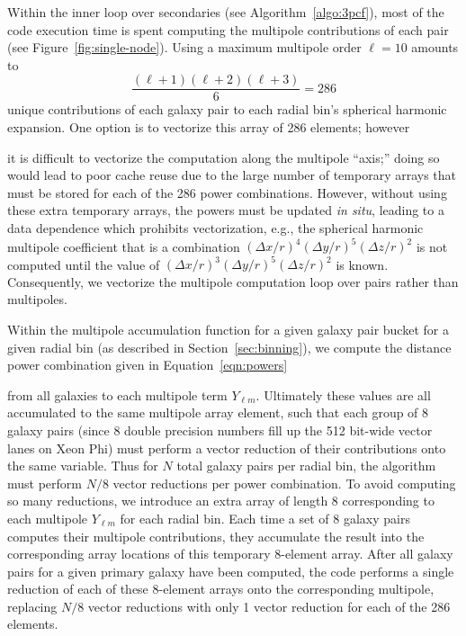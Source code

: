 Within the inner loop over secondaries (see Algorithm~\ref{algo:3pcf}), most of the code execution time is spent computing the multipole contributions of each pair (see  Figure~\ref{fig:single-node}).
Using a maximum multipole order $\ell = 10$ amounts to
\begin{equation*}
\frac{(\ell + 1) (\ell + 2) (\ell + 3)}{6} = 286
\end{equation*}
unique contributions of each galaxy pair to each radial bin's spherical harmonic expansion. 
One option is to vectorize this array of 286 elements; however

it is difficult to vectorize the computation along the multipole ``axis;'' doing so would lead to poor cache reuse due to the large number of temporary arrays that must be stored for each of the 286 power combinations.
However, without using these extra temporary arrays, the powers must be updated \textit{in situ}, leading to a data dependence which prohibits vectorization, e.g., the spherical harmonic multipole coefficient that is a combination $(\Delta x/r)^4(\Delta y/r)^5(\Delta z/r)^2$ is not computed until the value of $(\Delta x/r)^3(\Delta y/r)^5(\Delta z/r)^2$ is known.
Consequently, we vectorize the multipole computation loop over pairs rather than multipoles.

Within the multipole accumulation function for a given galaxy pair bucket for a given radial bin (as described in Section~\ref{sec:binning}), we compute the distance power combination given in Equation~\ref{eqn:powers}

from all galaxies to each multipole term $Y_{\ell m}$.
Ultimately these values are all accumulated to the same multipole array element, such that each group of 8 galaxy pairs (since 8 double precision numbers fill up the 512 bit-wide vector lanes on Xeon Phi) must perform a vector reduction of their contributions onto the same variable.
Thus for $N$ total galaxy pairs per radial bin, the algorithm must perform $N/8$ vector reductions per power combination.
To avoid computing so many reductions, we introduce an extra array of length 8 corresponding to each multipole $Y_{\ell m}$ for each radial bin.
Each time a set of 8 galaxy pairs computes their multipole contributions, they accumulate the result into the corresponding array locations of this temporary 8-element array.
After all galaxy pairs for a given primary galaxy have been computed, the code performs a single reduction of each of these 8-element arrays onto the corresponding multipole, replacing $N/8$ vector reductions with only 1 vector reduction for each of the 286 elements.

